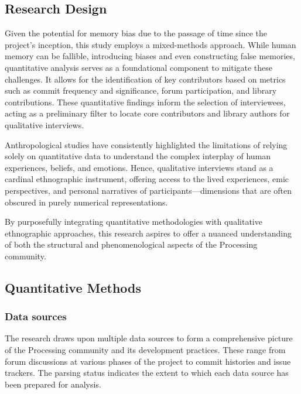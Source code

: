 

\subsection{Research Design}
Given the potential for memory bias due to the passage of time since the project's inception, this study employs a mixed-methods approach. While human memory can be fallible, introducing biases and even constructing false memories, quantitative analysis serves as a foundational component to mitigate these challenges. It allows for the identification of key contributors based on metrics such as commit frequency and significance, forum participation, and library contributions. These quantitative findings inform the selection of interviewees, acting as a preliminary filter to locate core contributors and library authors for qualitative interviews.

Anthropological studies have consistently highlighted the limitations of relying solely on quantitative data to understand the complex interplay of human experiences, beliefs, and emotions. Hence, qualitative interviews stand as a cardinal ethnographic instrument, offering access to the lived experiences, emic perspectives, and personal narratives of participants—dimensions that are often obscured in purely numerical representations.

By purposefully integrating quantitative methodologies with qualitative ethnographic approaches, this research aspires to offer a nuanced understanding of both the structural and phenomenological aspects of the Processing community.

\subsection{Quantitative Methods}
\subsubsection*{Data sources}

The research draws upon multiple data sources to form a comprehensive picture of the Processing community and its development practices. These range from forum discussions at various phases of the project to commit histories and issue trackers. The parsing status indicates the extent to which each data source has been prepared for analysis. 
        

